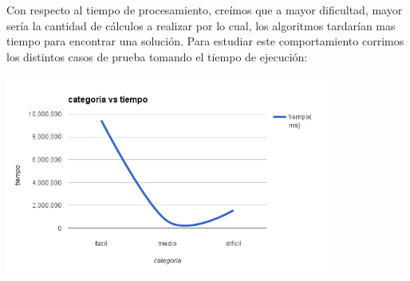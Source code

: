 \documentclass[a4paper,spanish]{article}
\begin{document}
Con respecto al tiempo de procesamiento, creímos que a mayor dificultad, mayor sería la cantidad de cálculos a realizar por lo cual, los algoritmos tardarían mas tiempo para encontrar una solución. Para estudiar este comportamiento corrimos los distintos casos de prueba tomando el tiempo de ejecución:

\begin{center}
\includegraphics[width=0.8\textwidth]{./graficos/categoriaVsTiempo.png}
\end{center}
\end{document}
